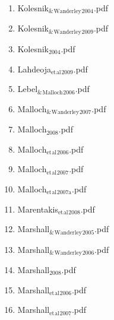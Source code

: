 \documentclass[11pt]{article}
\begin{document}
\begin{enumerate}
\begin{enumerate}
\begin{enumerate}
\item Kolesnik$_{\text{\&}}$$_{\text{Wanderley}}$$_{\text{2004}}$.pdf
\label{sec-1-1-1-1-49-2-1-7-25}

\item Kolesnik$_{\text{\&}}$$_{\text{Wanderley}}$$_{\text{2009}}$.pdf
\label{sec-1-1-1-1-49-2-1-7-26}

\item Kolesnik$_{\text{2004}}$.pdf
\label{sec-1-1-1-1-49-2-1-7-27}

\item Lahdeoja$_{\text{et}}$$_{\text{al}}$$_{\text{2009}}$.pdf
\label{sec-1-1-1-1-49-2-1-7-28}

\item Lebel$_{\text{\&}}$$_{\text{Malloch}}$$_{\text{2006}}$.pdf
\label{sec-1-1-1-1-49-2-1-7-29}

\item Malloch$_{\text{\&}}$$_{\text{Wanderley}}$$_{\text{2007}}$.pdf
\label{sec-1-1-1-1-49-2-1-7-30}

\item Malloch$_{\text{2008}}$.pdf
\label{sec-1-1-1-1-49-2-1-7-31}

\item Malloch$_{\text{et}}$$_{\text{al}}$$_{\text{2006}}$.pdf
\label{sec-1-1-1-1-49-2-1-7-32}

\item Malloch$_{\text{et}}$$_{\text{al}}$$_{\text{2007}}$.pdf
\label{sec-1-1-1-1-49-2-1-7-33}

\item Malloch$_{\text{et}}$$_{\text{al}}$$_{\text{2007a}}$.pdf
\label{sec-1-1-1-1-49-2-1-7-34}

\item Marentakis$_{\text{et}}$$_{\text{al}}$$_{\text{2008}}$.pdf
\label{sec-1-1-1-1-49-2-1-7-35}

\item Marshall$_{\text{\&}}$$_{\text{Wanderley}}$$_{\text{2005}}$.pdf
\label{sec-1-1-1-1-49-2-1-7-36}

\item Marshall$_{\text{\&}}$$_{\text{Wanderley}}$$_{\text{2006}}$.pdf
\label{sec-1-1-1-1-49-2-1-7-37}

\item Marshall$_{\text{2008}}$.pdf
\label{sec-1-1-1-1-49-2-1-7-38}

\item Marshall$_{\text{et}}$$_{\text{al}}$$_{\text{2006}}$.pdf
\label{sec-1-1-1-1-49-2-1-7-39}

\item Marshall$_{\text{et}}$$_{\text{al}}$$_{\text{2007}}$.pdf
\label{sec-1-1-1-1-49-2-1-7-40}


\end{enumerate}
\end{enumerate}
\end{enumerate}
\end{document}
